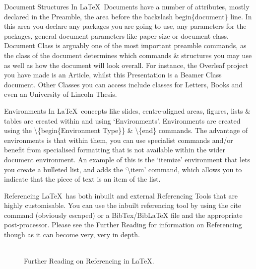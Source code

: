\documentclass{beamer}
\begin{document}
\begin{frame}{Document Structures}
In \LaTeX~Documents have a number of attributes, mostly declared in the Preamble, the area before the backslash begin\{document\} line. In this area you declare any packages you are going to use, any parameters for the packages, general document parameters like paper size or document class. Document Class is arguably one of the most important preamble commands, as the class of the document determines which commands \& structures you may use as well as how the document will look overall. For instance, the Overleaf project you have made is an Article, whilst this Presentation is a Beamer Class document. Other Classes you can access include classes for Letters, Books and even an University of Lincoln Thesis. 
\end{frame}

\begin{frame}{Environments}
In \LaTeX~concepts like slides, centre-aligned areas, figures, lists \& tables are created within and using `Environments'. Environments are created using the \textbackslash\{begin\{Environment Type\}\} \&  \textbackslash\{end\} commands. The advantage of environments is that within them, you can use specialist commands and/or benefit from specialised formatting that is not available within the wider document environment. An example of this is the `itemize' environment that lets you create a bulleted list, and adds the  `\textbackslash item' command, which allows you to indicate that the piece of text is an item of the list.
\end{frame}

\begin{frame}{Referencing}
\LaTeX~has both inbuilt and external Referencing Tools that are highly customisable. You can use the inbuilt referencing tool by using the cite command (obviously escaped) or a BibTex/BibLaTeX file and the appropriate post-processor. Please see the Further Reading for information on Referencing though as it can become very, very in depth.
\begin{figure}[h]
\\
Further Reading on Referencing in \LaTeX.
\end{figure}
\end{frame}
\end{document}
